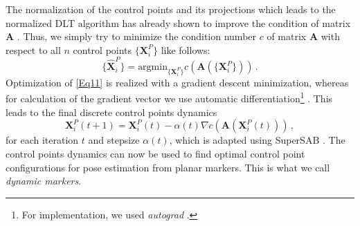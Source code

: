 \documentclass[letterpaper, 10 pt, conference]{ieeeconf}  %
\begin{document}
	The normalization of the control points and its projections which leads to the normalized DLT algorithm
	has already shown to improve the condition of matrix $\mathbf{A}$ \cite{Hartley1997}.
	Thus, we simply try to minimize the condition number $c$ of matrix $\mathbf{A}$
	with respect to all $n$ control points $\{\mathbf{X}_i^P\}$ like follows:
	\begin{equation}
	\label{Eq11}
	\{\hat{\mathbf{X}}_i^P\} = \text{argmin}_{\{\mathbf{X}_i^P\}} c\left(\mathbf{A}(\{\mathbf{X}_i^P\})\right) \,.
	\end{equation}
	Optimization of \eqref{Eq11} is realized with a gradient descent minimization,
	whereas for calculation of the gradient vector we use
	automatic differentiation\footnote{For implementation, we used \textit{autograd} \cite{Maclaurin2016}.} \cite{Rall1981}.
	This leads to the final discrete control points dynamics
	\begin{equation}
	\label{Eq12}
	\mathbf{X}_i^P(t+1) = \mathbf{X}_i^P(t) - \alpha(t) \nabla c\left(\mathbf{A}\left(\mathbf{X}_i^P(t)\right)\right)\,,
	\end{equation}
	for each iteration $t$ and stepsize $\alpha(t)$, which is adapted using SuperSAB \cite{Tollenaere1990}.
	The control points dynamics can now be used to find optimal control point configurations for pose   estimation from planar markers. This is what we call \textit{dynamic markers}.
	
	
\end{document}

